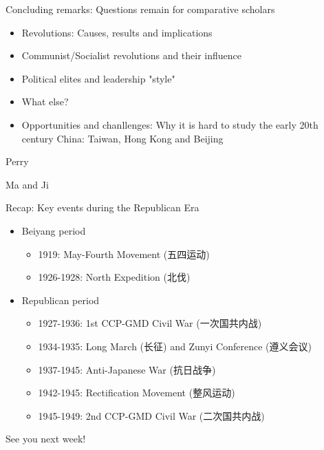 \documentclass[
  10pt,
  ignorenonframetext,
]{beamer}
\begin{document}
\begin{frame}{Concluding remarks: Questions remain for comparative
scholars}
\protect\hypertarget{concluding-remarks-questions-remain-for-comparative-scholars}{}
\begin{itemize}
  \item Revolutions: Causes, results and implications
  \vspace{0.3cm}
  \item Communist/Socialist revolutions and their influence
  \vspace{0.3cm}
  \item Political elites and leadership "style"
  \vspace{0.3cm}
  \item What else?
  \vspace{0.3cm}
  \item Opportunities and chanllenges: Why it is hard to study the early 20th century China: Taiwan, Hong Kong and Beijing
\end{itemize}
\end{frame}

\begin{frame}
Perry
\end{frame}

\begin{frame}
Ma and Ji
\end{frame}

\begin{frame}{Recap: Key events during the Republican Era}
\protect\hypertarget{recap-key-events-during-the-republican-era}{}
\begin{itemize}
  \item Beiyang period
  \vspace{0.1cm}
  \begin{itemize}
    \item 1919: May-Fourth Movement (五四运动)
    \item 1926-1928: North Expedition (北伐)
  \end{itemize}
  \vspace{0.3cm}
  \item Republican period
  \begin{itemize}
    \item 1927-1936: 1st CCP-GMD Civil War (一次国共内战)
    \item 1934-1935: Long March (长征) and Zunyi Conference (遵义会议)
    \item 1937-1945: Anti-Japanese War (抗日战争)
    \item 1942-1945: Rectification Movement (整风运动)
    \item 1945-1949: 2nd CCP-GMD Civil War (二次国共内战)
  \end{itemize}
\end{itemize}
\end{frame}

\begin{frame}
\vspace{1cm}

See you next week!
\end{frame}
\end{document}
